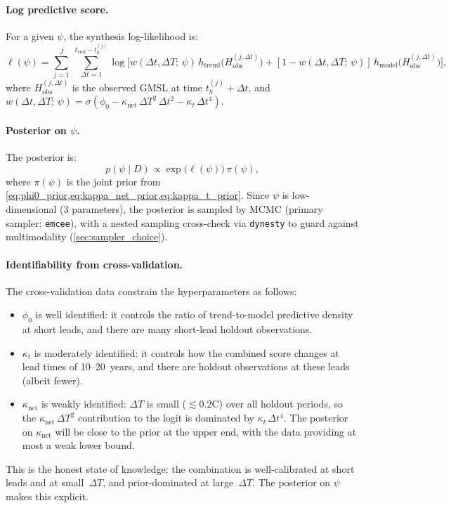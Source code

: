 \documentclass[11pt]{article}
\newcommand{\dT}{\Delta T}
\newcommand{\tend}{t_{\mathrm{end}}}
\begin{document}
\paragraph{Log predictive score.}  For a given $\psi$, the synthesis log-likelihood is:
\begin{equation}
  \ell(\psi) = \sum_{j=1}^{J}\; \sum_{\Delta t = 1}^{\tend - t_h^{(j)}} \log\!\Big[w(\Delta t, \dT;\,\psi)\,h_{\mathrm{trend}}\!\big(H_{\mathrm{obs}}^{(j,\Delta t)}\big) + [1 - w(\Delta t, \dT;\,\psi)]\,h_{\mathrm{model}}\!\big(H_{\mathrm{obs}}^{(j,\Delta t)}\big)\Big],
  \label{eq:cv_loglik}
\end{equation}
where $H_{\mathrm{obs}}^{(j,\Delta t)}$ is the observed GMSL at time $t_h^{(j)} + \Delta t$, and $w(\Delta t, \dT;\,\psi) = \sigma(\phi_0 - \kappa_{\mathrm{net}}\,\dT^2\,\Delta t^2 - \kappa_t\,\Delta t^4)$.

\paragraph{Posterior on $\psi$.}  The posterior is:
\begin{equation}
  p(\psi \mid D) \propto \exp\!\big(\ell(\psi)\big)\,\pi(\psi),
  \label{eq:psi_posterior}
\end{equation}
where $\pi(\psi)$ is the joint prior from \cref{eq:phi0_prior,eq:kappa_net_prior,eq:kappa_t_prior}.  Since $\psi$ is low-dimensional (3 parameters), the posterior is sampled by MCMC (primary sampler: \texttt{emcee}), with a nested sampling cross-check via \texttt{dynesty} to guard against multimodality (\cref{sec:sampler_choice}).

\paragraph{Identifiability from cross-validation.}
\label{sec:cv_identifiability}
The cross-validation data constrain the hyperparameters as follows:
\begin{itemize}
  \item $\phi_0$ is well identified: it controls the ratio of trend-to-model predictive density at short leads, and there are many short-lead holdout observations.
  \item $\kappa_t$ is moderately identified: it controls how the combined score changes at lead times of 10--20~years, and there are holdout observations at these leads (albeit fewer).
  \item $\kappa_{\mathrm{net}}$ is weakly identified: $\dT$ is small ($\lesssim 0.2$\textdegree C) over all holdout periods, so the $\kappa_{\mathrm{net}}\,\dT^2$ contribution to the logit is dominated by $\kappa_t\,\Delta t^4$.  The posterior on $\kappa_{\mathrm{net}}$ will be close to the prior at the upper end, with the data providing at most a weak lower bound.
\end{itemize}
This is the honest state of knowledge: the combination is well-calibrated at short leads and at small~$\dT$, and prior-dominated at large~$\dT$.  The posterior on $\psi$ makes this explicit.
\end{document}
